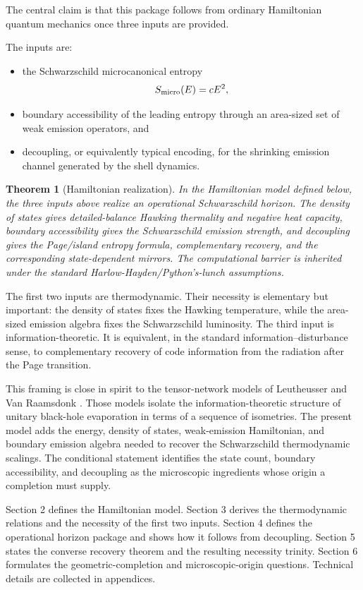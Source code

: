 \documentclass[12pt]{article}
\newtheorem{theorem}{Theorem}
\newcommand{\be}{\begin{equation}}
\newcommand{\ee}{\end{equation}}
\newcommand{\Smicro}{S_{\rm micro}}
\begin{document}
The central claim is that this package follows from ordinary Hamiltonian
quantum mechanics once three inputs are provided.

The inputs are:
\begin{itemize}
\item
the Schwarzschild microcanonical entropy
\be
  \Smicro(E)=cE^2 ,
\ee
\item
boundary accessibility of the leading entropy through an area-sized set of
weak emission operators, and
\item
decoupling, or equivalently typical encoding, for the shrinking emission
channel generated by the shell dynamics.
\end{itemize}

\begin{theorem}[Hamiltonian realization]
In the Hamiltonian model defined below, the three inputs above realize an
operational Schwarzschild horizon.  The density of states gives
detailed-balance Hawking thermality and negative heat capacity, boundary
accessibility gives the Schwarzschild emission strength, and decoupling gives
the Page/island entropy formula, complementary recovery, and the corresponding
state-dependent mirrors.  The computational barrier is inherited under the
standard Harlow-Hayden/Python's-lunch assumptions.
\end{theorem}

The first two inputs are thermodynamic.  Their necessity is elementary but
important: the density of states fixes the Hawking temperature, while the
area-sized emission algebra fixes the Schwarzschild luminosity.  The third
input is information-theoretic.  It is equivalent, in the standard
information--disturbance sense, to complementary recovery of code information
from the radiation after the Page transition.

This framing is close in spirit to the tensor-network models of Leutheusser
and Van Raamsdonk \cite{LeutheusserVanRaamsdonk2017}.  Those models isolate the
information-theoretic structure of unitary black-hole evaporation in terms of a
sequence of isometries.  The present model adds the energy, density of states,
weak-emission Hamiltonian, and boundary emission algebra needed to recover the
Schwarzschild thermodynamic scalings.  The conditional statement identifies
the state count, boundary accessibility, and decoupling as the microscopic
ingredients whose origin a completion must supply.

Section 2 defines the Hamiltonian model.  Section 3 derives the thermodynamic
relations and the necessity of the first two inputs.  Section 4 defines the
operational horizon package and shows how it follows from decoupling.  Section
5 states the converse recovery theorem and the resulting necessity trinity.
Section 6 formulates the geometric-completion and microscopic-origin
questions.  Technical details are collected in appendices.
\end{document}
